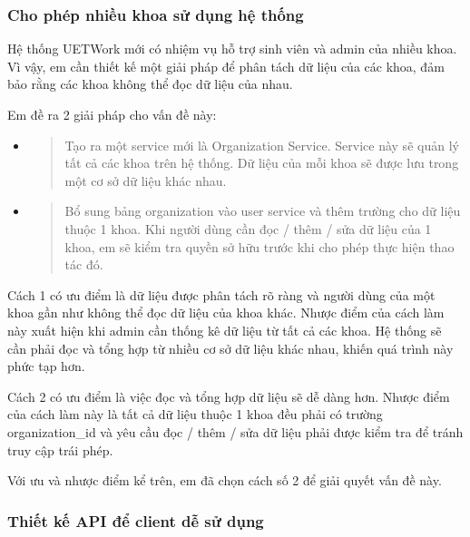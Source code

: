 \documentclass[./../main.tex]{subfiles}
\begin{document}
\hypertarget{cho-phuxe9p-nhiux1ec1u-khoa-sux1eed-dux1ee5ng-hux1ec7-thux1ed1ng}{%
\subsubsection{Cho phép nhiều khoa sử dụng hệ
thống}\label{cho-phuxe9p-nhiux1ec1u-khoa-sux1eed-dux1ee5ng-hux1ec7-thux1ed1ng}}

Hệ thống UETWork mới có nhiệm vụ hỗ trợ sinh viên và admin của nhiều
khoa. Vì vậy, em cần thiết kế một giải pháp để phân tách dữ liệu của các
khoa, đảm bảo rằng các khoa không thể đọc dữ liệu của nhau.

Em đề ra 2 giải pháp cho vấn đề này:

\begin{itemize}
\item
  \begin{quote}
  Tạo ra một service mới là Organization Service. Service này sẽ quản lý
  tất cả các khoa trên hệ thống. Dữ liệu của mỗi khoa sẽ được lưu trong
  một cơ sở dữ liệu khác nhau.
  \end{quote}
\item
  \begin{quote}
  Bổ sung bảng organization vào user service và thêm trường
   cho dữ liệu thuộc 1 khoa. Khi người dùng cần đọc /
  thêm / sửa dữ liệu của 1 khoa, em sẽ kiểm tra quyền sở hữu trước khi
  cho phép thực hiện thao tác đó.
  \end{quote}
\end{itemize}

Cách 1 có ưu điểm là dữ liệu được phân tách rõ ràng và người dùng của
một khoa gần như không thể đọc dữ liệu của khoa khác. Nhược điểm của
cách làm này xuất hiện khi admin cần thống kê dữ liệu từ tất cả các
khoa. Hệ thống sẽ cần phải đọc và tổng hợp từ nhiều cơ sở dữ liệu khác
nhau, khiến quá trình này phức tạp hơn.

Cách 2 có ưu điểm là việc đọc và tổng hợp dữ liệu sẽ dễ dàng hơn. Nhược
điểm của cách làm này là tất cả dữ liệu thuộc 1 khoa đều phải có trường
organization\_id và yêu cầu đọc / thêm / sửa dữ liệu phải được kiểm tra
để tránh truy cập trái phép.

Với ưu và nhược điểm kể trên, em đã chọn cách số 2 để giải quyết vấn đề
này.

\hypertarget{thiux1ebft-kux1ebf-api-ux111ux1ec3-client-dux1ec5-sux1eed-dux1ee5ng}{%
\subsubsection{Thiết kế API để client dễ sử
dụng}\label{thiux1ebft-kux1ebf-api-ux111ux1ec3-client-dux1ec5-sux1eed-dux1ee5ng}}
\end{document}
